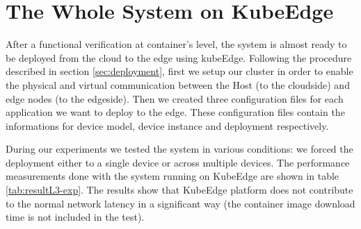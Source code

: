 \section{The Whole System on KubeEdge}
After a functional verification at container's level, the system is almost ready to be deployed from the cloud to the edge using kubeEdge.
Following the procedure described in section \ref{sec:deployment}, first we setup our cluster in order to enable the physical and virtual communication between the Host (to the cloudside) and edge nodes (to the edgeside).
Then we created three configuration files for each application we want to deploy to the edge.
These configuration files contain the informations for device model, device instance and deployment respectively.

During our experiments we tested the system in various conditions: we forced the deployment either to a single device or across multiple devices.
The performance measurements done with the system running on KubeEdge are shown in table \ref{tab:resultL3-exp}.
The results show that KubeEdge platform does not contribute to the normal network latency in a significant way (the container image download time is not included in the test).




